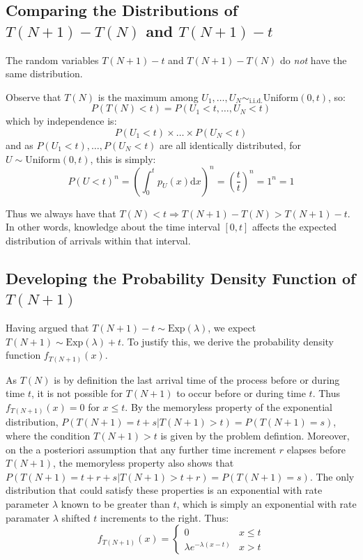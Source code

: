 \documentclass[11pt, oneside]{article}   	%
\begin{document}
\subsection{Comparing the Distributions of $T(N+1)-T(N)$ and $T(N+1)-t$}
The random variables $T(N + 1) - t$ and $T(N + 1) - T(N)$ do \emph{not} have the same distribution.

Observe that $T(N)$ is the maximum among $U_1, \dots, U_N \sim_{\text{i.i.d.}} \text{Uniform}(0, t)$, so:
$$P(T(N) < t) = P(U_1 < t, \dots, U_N < t)$$
which by independence is:
$$P(U_1 < t) \times \dots \times P(U_N < t)$$
and as $P(U_1 < t), \dots,  P(U_N < t)$ are all identically distributed, for $U \sim \text{Uniform}(0, t)$, this is simply:
$$P(U < t)^n = \left( \int_{0}^{t} p_U(x) \mathrm{d}x \right)^n = \left(\frac{t}{t}\right)^n = 1^n = 1$$

Thus we always have that $T(N) < t \Rightarrow T(N + 1) - T(N) > T(N + 1) - t$. In other words, knowledge about the time interval $[0,t]$ affects the expected distribution of arrivals within that interval.
\subsection{Developing the Probability Density Function of $T(N+1)$}
Having argued that $T(N + 1) - t \sim \text{Exp}(\lambda)$, we expect $T(N + 1) \sim \text{Exp}(\lambda) + t$. To justify this, we derive the probability density function $f_{T(N + 1)}(x)$.

As $T(N)$ is by definition the last arrival time of the process before or during time $t$, it is not possible for $T(N + 1)$ to occur before or during time $t$. Thus $f_{T(N + 1)}(x) = 0$ for $x \leq t$. By the memoryless property of the exponential distribution, $P(T(N + 1) = t + s | T(N + 1) > t) = P(T(N + 1) = s)$, where the condition $T(N + 1) > t$ is given by the problem defintion. Moreover, on the a posteriori assumption that any further time increment $r$ elapses before $T(N + 1)$, the memoryless property also shows that $P(T(N + 1) = t + r + s | T(N + 1) > t + r) = P(T(N + 1) = s)$. The only distribution that could satisfy these properties is an exponential with rate parameter $\lambda$ known to be greater than $t$, which is simply an exponential with rate paramater $\lambda$ shifted $t$ increments to the right. Thus:
\[
f_{T(N + 1)}(x) =
\begin{cases} 
      0 & x \leq t \\
      \lambda e^{-\lambda (x - t)} & x > t 
   \end{cases}
\]
\end{document}
